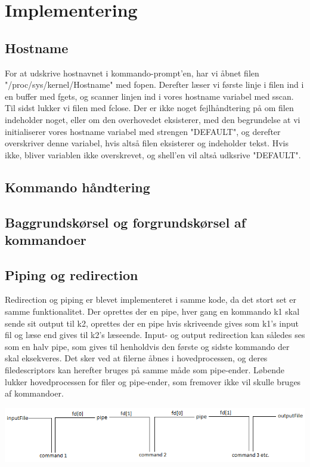 \section{Implementering}

\subsection{Hostname}
For at udskrive hostnavnet i kommando-prompt'en, har vi åbnet filen "/proc/sys/kernel/Hostname" med fopen. Derefter læser vi første linje i filen ind i en buffer med fgets, og scanner linjen ind i vores hostname variabel med sscan. Til sidst lukker vi filen med fclose. Der er ikke noget fejlhåndtering på om filen indeholder noget, eller om den overhovedet eksisterer, med den begrundelse at vi initialiserer vores hostname variabel med strengen "DEFAULT", og derefter overskriver denne variabel, hvis altså filen eksisterer og indeholder tekst. Hvis ikke, bliver variablen ikke overskrevet, og shell'en vil altså udksrive "DEFAULT".

\subsection{Kommando håndtering}

\subsection{Baggrundskørsel og forgrundskørsel af kommandoer}


\subsection{Piping og redirection}
Redirection og piping er blevet implementeret i samme kode, da det stort set er samme funktionalitet.
Der oprettes der en pipe, hver gang en kommando k1 skal sende sit output til k2, oprettes der en pipe hvis skriveende gives som k1's input fil og læse end gives til k2's læseende. Input- og output redirection kan således ses som en halv pipe, som gives til henholdvis den første og sidste kommando der skal eksekveres. Det sker ved at filerne åbnes i hovedprocessen, og deres filedescriptors kan herefter bruges på samme måde som pipe-ender. Løbende lukker hovedprocessen for filer og pipe-ender, som fremover ikke vil skulle bruges af kommandoer.

\vspace{1cm}
\includegraphics[scale=0.75, trim= 2cm 0cm 0cm 0cm]{pipefig}


